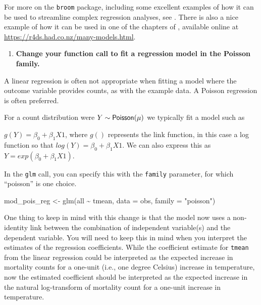 \documentclass[
]{book}
\newenvironment{Shaded}{\begin{snugshade}}{\end{snugshade}}
\newcommand{\AttributeTok}[1]{\textcolor[rgb]{0.77,0.63,0.00}{#1}}
\newcommand{\FunctionTok}[1]{\textcolor[rgb]{0.00,0.00,0.00}{#1}}
\newcommand{\NormalTok}[1]{#1}
\newcommand{\OtherTok}[1]{\textcolor[rgb]{0.56,0.35,0.01}{#1}}
\newcommand{\SpecialCharTok}[1]{\textcolor[rgb]{0.00,0.00,0.00}{#1}}
\newcommand{\StringTok}[1]{\textcolor[rgb]{0.31,0.60,0.02}{#1}}
\providecommand{\tightlist}{%
  \setlength{\itemsep}{0pt}\setlength{\parskip}{0pt}}
\begin{document}
For more on the \texttt{broom} package, including some excellent examples of how it
can be used to streamline complex regression analyses, see \citet{robinson2014broom}.
There is also a nice example of how it can be used in one of the chapters of
\citet{wickham2016r}, available online at \url{https://r4ds.had.co.nz/many-models.html}.

\begin{enumerate}
\def\labelenumi{\arabic{enumi}.}
\setcounter{enumi}{1}
\tightlist
\item
  \textbf{Change your function call to fit a regression model in the Poisson family.}
\end{enumerate}

A linear regression is often not appropriate when fitting a model where the
outcome variable provides counts, as with the example data. A Poisson regression
is often preferred.

For a count distribution were \(Y \sim {\sf Poisson(\mu)}\) we typically fit a model
such as

\(g(Y)=\beta_{0}+\beta_{1}X1\), where \(g()\) represents the link function, in this
case a log function so that \(log(Y)=\beta_{0}+\beta_{1}X1\). We can also express
this as \(Y=exp(\beta_{0}+\beta_{1}X1)\).

In the \texttt{glm} call, you can specify this with the \texttt{family}
parameter, for which ``poisson'' is one choice.

\begin{Shaded}
\begin{Highlighting}[]
\NormalTok{mod\_pois\_reg }\OtherTok{\textless{}{-}} \FunctionTok{glm}\NormalTok{(all }\SpecialCharTok{\textasciitilde{}}\NormalTok{ tmean, }\AttributeTok{data =}\NormalTok{ obs, }\AttributeTok{family =} \StringTok{"poisson"}\NormalTok{)}
\end{Highlighting}
\end{Shaded}

One thing to keep in mind with this change is that the model now uses a
non-identity link between the combination of independent variable(s) and the
dependent variable. You will need to keep this in mind when you interpret
the estimates of the regression coefficients. While the coefficient estimate
for \texttt{tmean} from the linear regression could be interpreted as the expected
increase in mortality counts for a one-unit (i.e., one degree Celsius) increase
in temperature, now the estimated coefficient should be interpreted as the
expected increase in the natural log-transform of mortality count for a one-unit
increase in temperature.
\end{document}
